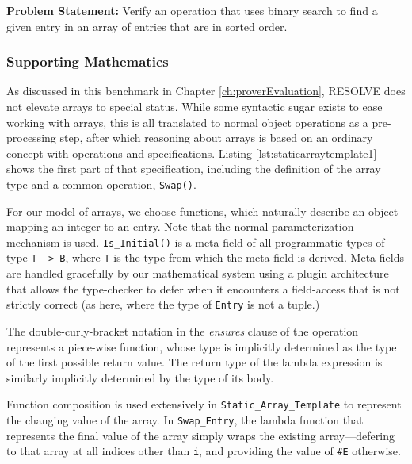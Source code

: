 \textbf{Problem Statement:} Verify an operation that uses binary search to find a given entry in an array of entries that are in sorted order.

		\subsubsection{Supporting Mathematics}	

As discussed in this benchmark in Chapter \ref{ch:proverEvaluation}, RESOLVE does not elevate arrays to special status.  While some syntactic sugar exists to ease working with arrays, this is all translated to normal object operations as a pre-processing step, after which reasoning about arrays is based on an ordinary concept with operations and specifications.  Listing \ref{lst:staticarraytemplate1} shows the first part of that specification, including the definition of the array type and a common operation, \texttt{Swap()}.



For our model of arrays, we choose functions, which naturally describe an object mapping an integer to an entry.  Note that the normal parameterization mechanism is used.  \texttt{Is\_Initial()} is a meta-field of all programmatic types of type \texttt{T -> B}, where \texttt{T} is the type from which the meta-field is derived.  Meta-fields are handled gracefully by our mathematical system using a plugin architecture that allows the type-checker to defer when it encounters a field-access that is not strictly correct (as here, where the type of \texttt{Entry} is not a tuple.)

The double-curly-bracket notation in the \emph{ensures} clause of the operation represents a piece-wise function, whose type is implicitly determined as the type of the first possible return value.  The return type of the lambda expression is similarly implicitly determined by the type of its body.

Function composition is used extensively in \texttt{Static\_Array\_Template} to represent the changing value of the array.  In \texttt{Swap\_Entry}, the lambda function that represents the final value of the array simply wraps the existing array---defering to that array at all indices other than \texttt{i}, and providing the value of \texttt{\#E} otherwise.

